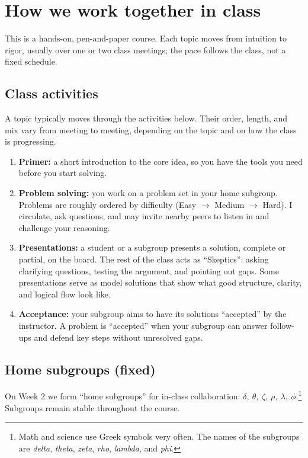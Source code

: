 \documentclass[oneside,11pt]{amsart}
\begin{document}
\section{How we work together in class}

This is a hands-on, pen-and-paper course. Each topic moves from intuition to rigor, usually over one or two class meetings; the pace follows the class, not a fixed schedule.

\subsection{Class activities}

A topic typically moves through the activities below. Their order, length, and mix vary from meeting to meeting, depending on the topic and on how the class is progressing.

\begin{enumerate}[$\bullet$]
    \item \textbf{Primer:} a short introduction to the core idea, so you have the tools you need before you start solving.
    \item \textbf{Problem solving:} you work on a problem set in your home subgroup. Problems are roughly ordered by difficulty (Easy $\to$ Medium $\to$ Hard). I circulate, ask questions, and may invite nearby peers to listen in and challenge your reasoning.
    \item \textbf{Presentations:} a student or a subgroup presents a solution, complete or partial, on the board. The rest of the class acts as ``Skeptics'': asking clarifying questions, testing the argument, and pointing out gaps. Some presentations serve as model solutions that show what good structure, clarity, and logical flow look like.
    \item \textbf{Acceptance:} your subgroup aims to have its solutions ``accepted'' by the instructor. A problem is ``accepted'' when your subgroup can answer follow-ups and defend key steps without unresolved gaps.
\end{enumerate}

\subsection{Home subgroups (fixed)}
On Week 2 we form ``home subgroups'' for in-class collaboration:
$\delta, \ \theta, \ \zeta, \ \rho, \ \lambda, \ \phi$.\footnote{Math and science use Greek symbols very often. The names of the subgroups are
\emph{delta}, \emph{theta}, \emph{zeta}, \emph{rho}, \emph{lambda}, and \emph{phi}.}
Subgroups remain stable throughout the course.
\end{document}
